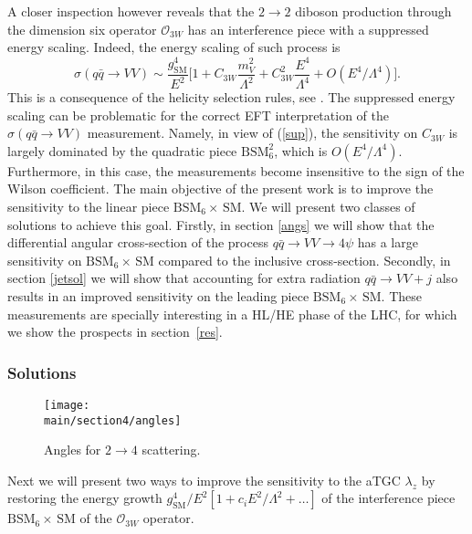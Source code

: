 \documentclass[../report.tex]{subfiles}
\providecommand{\main}{..}
\begin{document}
A closer inspection however reveals that the  $2\to 2$ diboson production through the dimension six operator $\mathcal{O}_{3W}$  has an interference piece with a suppressed energy scaling. 
Indeed, the energy scaling of such process is  
\begin{equation}
\sigma ( q\bar q \rightarrow VV ) \sim \frac{g_\text{SM}^4}{E^2}\bigg[  1 +  C_{3W}\frac{m_V^2}{\Lambda^2}  +C_{3W}^2 \frac{E^4}{\Lambda^4}  + O(E^4/\Lambda^4) \bigg]. \label{sup}
\end{equation} 
This is a consequence of the  helicity selection rules, see    
\cite{Dixon:1993xd,Azatov:2016sqh,Azatov:2017kzw,Panico:2017frx}.
The suppressed energy scaling can be problematic for the correct EFT  
interpretation of the $\sigma(q\bar q \to V V)$ measurement. 
Namely, in view of (\ref{sup}), the sensitivity on $C_{3W}$ is largely 
dominated by the quadratic piece $\text{BSM}_6^2$, which is 
$O(E^4/\Lambda^4)$. 
 Furthermore, in this case, the measurements become insensitive to the sign of the Wilson coefficient.
The main objective of the present work is to 
improve the sensitivity to the linear piece $\text{BSM$_6\times\,$SM}$.
We will present two classes of solutions to achieve this goal. Firstly, in section \ref{angs} we  will show that the differential angular cross-section 
 of the process $q\bar q \rightarrow VV\rightarrow 4\psi$ has a large sensitivity on $\text{BSM$_6\times\,$SM}$ compared to the inclusive cross-section.   Secondly, in section \ref{jetsol} we will show that accounting for extra radiation $q\bar q \rightarrow VV+j$ also results in an improved sensitivity on the leading piece $\text{BSM$_6\times\,$SM}$.
These measurements are specially interesting in a HL/HE phase of the LHC, for which we show the prospects in  section~\ref{res}.

\subsubsection{Solutions}


\begin{figure}[t]
\begin{center}
\texttt{[image: \\main/section4/angles]}
\end{center}
\vspace{-.3cm}
\caption{Angles for $2\to 4$ scattering. \label{fig:ang}}
\end{figure}

Next we will present two ways to  improve the sensitivity to the aTGC $\lambda_z$ by restoring the energy growth
$g_\text{SM}^4/E^2\left[1+c_i E^2/\Lambda^2+  \dots\right]$ of the interference piece $\text{BSM$_6\times\,$SM}$ of the  $\mathcal{O}_{3W}$ operator.
\end{document}
